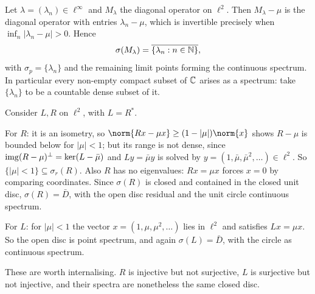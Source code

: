 \documentclass[a4paper]{scrartcl}
\begin{document}
\begin{center}
\end{center}

\begin{example}
	Let $\lambda = (\lambda_n)\in\ell^\infty$ and $M_\lambda$ the diagonal operator on $\ell^2$. Then $M_\lambda - \mu$ is the diagonal operator with entries $\lambda_n - \mu$, which is invertible precisely when $\inf_n|\lambda_n-\mu|>0$. Hence
	$$\sigma(M_\lambda) = \overline{\{\lambda_n : n \in\mathbb{N}\}},$$
	with $\sigma_p = \{\lambda_n\}$ and the remaining limit points forming the continuous spectrum. In particular every non-empty compact subset of $\mathbb{C}$ arises as a spectrum: take $\{\lambda_n\}$ to be a countable dense subset of it.
\end{example}

\begin{example}
	Consider $L, R$ on $\ell^2$, with $L = R^*$.

	For $R$: it is an isometry, so $\norm{Rx-\mu x}\geq(1-|\mu|)\norm{x}$ shows $R - \mu$ is bounded below for $|\mu|<1$; but its range is not dense, since $\operatorname{img}(R-\mu)^\perp = \ker(L - \bar\mu)$ and $L y = \bar\mu y$ is solved by $y = (1, \bar\mu, \bar\mu^2, \dots)\in\ell^2$. So $\{|\mu|<1\}\subseteq\sigma_r(R)$. Also $R$ has no eigenvalues: $Rx = \mu x$ forces $x = 0$ by comparing coordinates. Since $\sigma(R)$ is closed and contained in the closed unit disc, $\sigma(R) = \bar{D}$, with the open disc residual and the unit circle continuous spectrum.

	For $L$: for $|\mu|<1$ the vector $x = (1,\mu,\mu^2,\dots)$ lies in $\ell^2$ and satisfies $Lx = \mu x$. So the open disc is point spectrum, and again $\sigma(L)=\bar D$, with the circle as continuous spectrum.

	These are worth internalising. $R$ is injective but not surjective, $L$ is surjective but not injective, and their spectra are nonetheless the same closed disc.
\end{example}
\end{document}
